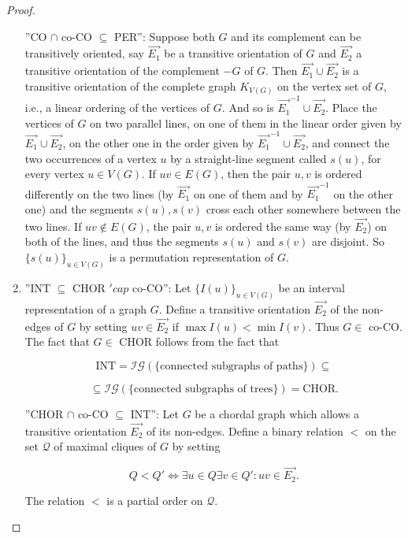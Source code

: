 \begin{proof}
\begin{enumerate}
		”CO $\cap$ co-CO $\subseteq$ PER”: Suppose both $G$ and its complement can be transitively oriented, say $\overrightarrow{E_1}$ be a transitive orientation of $G$ and $\overrightarrow{E_2}$ a transitive orientation of the complement $-G$ of $G$. Then $\overrightarrow{E_1} \cup \overrightarrow{E_2}$ is a transitive orientation of the complete graph $K_{V(G)}$ on the vertex set of $G$, i.e., a linear ordering of the vertices of $G$. And so is $\overrightarrow{E_1}^{-1} \cup \overrightarrow{E_2}$. Place the vertices of $G$ on two parallel lines, on one of them in the linear order given by $\overrightarrow{E_1} \cup \overrightarrow{E_2}$, on the other one in the order given by $\overrightarrow{E_1}^{-1} \cup \overrightarrow{E_2}$, and connect the two occurrences of a vertex $u$ by a straight-line segment called $s(u)$, for every vertex $u \in V(G)$. If $uv \in E(G)$, then the pair $u, v$ is ordered differently on the two lines (by $\overrightarrow{E_1}$ on one of them and by $\overrightarrow{E_1}^{-1}$ on the other one) and the segments $s(u), s(v)$ cross each other somewhere between	the two lines. If $uv \notin E(G)$, the pair $u, v$ is ordered the same way (by $\overrightarrow{E_2}$) on both of the lines, and thus the segments $s(u)$ and $s(v)$ are disjoint. So $\{s(u)\}_{u \in V(G)}$ is a permutation representation of $G$.
		
		\item ”INT $\subseteq$ CHOR $'cap$ co-CO”: Let $\{I(u)\}_{u \in V(G)}$ be an interval representation of a graph $G$. Define a transitive orientation $\overrightarrow{E_2}$ of the non-edges of $G$ by setting $uv \in \overrightarrow{E_2}$ if $\max I(u) < \min I(v)$. Thus $G \in$ co-CO. The fact that $G \in$ CHOR follows from the fact that
		
		$$
		\text{INT} = \mathcal{IG}(\{\text{connected subgraphs of paths}\}) \subseteq
		$$
		
		$$
		\subseteq \mathcal{IG}(\{\text{connected subgraphs of trees}\}) = \text{CHOR}.
		$$
		
		”CHOR $\cap$ co-CO $\subseteq$ INT”: Let $G$ be a chordal graph which allows a transitive orientation $\overrightarrow{E_2}$ of its non-edges. Define a binary relation $<$ on the set $\mathcal{Q}$ of maximal cliques of $G$ by setting
		
		$$
		Q < Q' \Leftrightarrow \exists u \in Q \exists v \in Q' : uv \in \overrightarrow{E_2}.
		$$
		
		\begin{claim}
			The relation $<$ is a partial order on $\mathcal{Q}$.
		\end{claim}
		

\end{enumerate}
\end{proof}
